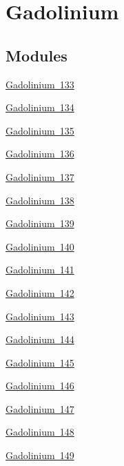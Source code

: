 \hypertarget{group___isotope_const-_gadolinium}{}\section{Gadolinium}
\label{group___isotope_const-_gadolinium}
\subsection*{Modules}
\begin{DoxyCompactItemize}
\item 
\mbox{\hyperlink{group___isotope_const-_gadolinium-_gd133}{Gadolinium 133}}
\item 
\mbox{\hyperlink{group___isotope_const-_gadolinium-_gd134}{Gadolinium 134}}
\item 
\mbox{\hyperlink{group___isotope_const-_gadolinium-_gd135}{Gadolinium 135}}
\item 
\mbox{\hyperlink{group___isotope_const-_gadolinium-_gd136}{Gadolinium 136}}
\item 
\mbox{\hyperlink{group___isotope_const-_gadolinium-_gd137}{Gadolinium 137}}
\item 
\mbox{\hyperlink{group___isotope_const-_gadolinium-_gd138}{Gadolinium 138}}
\item 
\mbox{\hyperlink{group___isotope_const-_gadolinium-_gd139}{Gadolinium 139}}
\item 
\mbox{\hyperlink{group___isotope_const-_gadolinium-_gd140}{Gadolinium 140}}
\item 
\mbox{\hyperlink{group___isotope_const-_gadolinium-_gd141}{Gadolinium 141}}
\item 
\mbox{\hyperlink{group___isotope_const-_gadolinium-_gd142}{Gadolinium 142}}
\item 
\mbox{\hyperlink{group___isotope_const-_gadolinium-_gd143}{Gadolinium 143}}
\item 
\mbox{\hyperlink{group___isotope_const-_gadolinium-_gd144}{Gadolinium 144}}
\item 
\mbox{\hyperlink{group___isotope_const-_gadolinium-_gd145}{Gadolinium 145}}
\item 
\mbox{\hyperlink{group___isotope_const-_gadolinium-_gd146}{Gadolinium 146}}
\item 
\mbox{\hyperlink{group___isotope_const-_gadolinium-_gd147}{Gadolinium 147}}
\item 
\mbox{\hyperlink{group___isotope_const-_gadolinium-_gd148}{Gadolinium 148}}
\item 
\mbox{\hyperlink{group___isotope_const-_gadolinium-_gd149}{Gadolinium 149}}

\end{DoxyCompactItemize}
